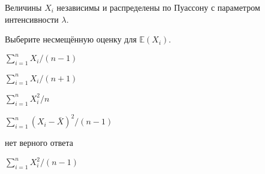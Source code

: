 
\begin{question}
Величины \(X_i\) независимы и распределены по Пуассону с параметром
интенсивности \(\lambda\).

Выберите несмещённую оценку для \(\mathbb{E}(X_i)\).
\begin{answerlist}
  \item \(\sum_{i=1}^n X_i / (n - 1)\)
  \item \(\sum_{i=1}^n X_i / (n + 1)\)
  \item \(\sum_{i=1}^n X_i^2 / n\)
  \item \(\sum_{i=1}^n (X_i - \bar X)^2 / (n - 1)\)
  \item нет верного ответа
  \item \(\sum_{i=1}^n X_i^2 / (n - 1)\)
\end{answerlist}
\end{question}


